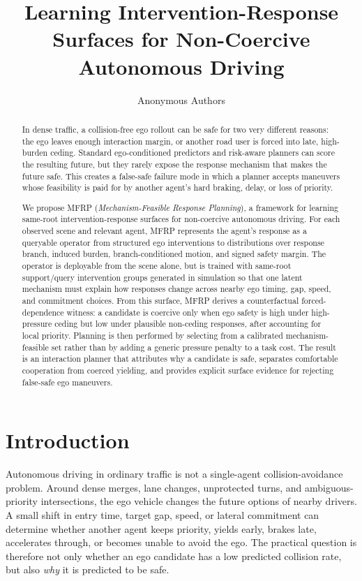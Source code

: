 \documentclass[10pt]{article}
\title{Learning Intervention-Response Surfaces for Non-Coercive Autonomous Driving}
\author{Anonymous Authors}
\date{}
\newcommand{\framework}{MFRP}
\begin{document}
\maketitle

\begin{abstract}
In dense traffic, a collision-free ego rollout can be safe for two very different reasons: the ego leaves enough interaction margin, or another road user is forced into late, high-burden ceding. Standard ego-conditioned predictors and risk-aware planners can score the resulting future, but they rarely expose the response mechanism that makes the future safe. This creates a false-safe failure mode in which a planner accepts maneuvers whose feasibility is paid for by another agent's hard braking, delay, or loss of priority.

We propose \framework{} (\emph{Mechanism-Feasible Response Planning}), a framework for learning same-root intervention-response surfaces for non-coercive autonomous driving. For each observed scene and relevant agent, \framework{} represents the agent's response as a queryable operator from structured ego interventions to distributions over response branch, induced burden, branch-conditioned motion, and signed safety margin. The operator is deployable from the scene alone, but is trained with same-root support/query intervention groups generated in simulation so that one latent mechanism must explain how responses change across nearby ego timing, gap, speed, and commitment choices. From this surface, \framework{} derives a counterfactual forced-dependence witness: a candidate is coercive only when ego safety is high under high-pressure ceding but low under plausible non-ceding responses, after accounting for local priority. Planning is then performed by selecting from a calibrated mechanism-feasible set rather than by adding a generic pressure penalty to a task cost. The result is an interaction planner that attributes why a candidate is safe, separates comfortable cooperation from coerced yielding, and provides explicit surface evidence for rejecting false-safe ego maneuvers.
\end{abstract}

\section{Introduction}

Autonomous driving in ordinary traffic is not a single-agent collision-avoidance problem. Around dense merges, lane changes, unprotected turns, and ambiguous-priority intersections, the ego vehicle changes the future options of nearby drivers. A small shift in entry time, target gap, speed, or lateral commitment can determine whether another agent keeps priority, yields early, brakes late, accelerates through, or becomes unable to avoid the ego. The practical question is therefore not only whether an ego candidate has a low predicted collision rate, but also \emph{why} it is predicted to be safe.
\end{document}
